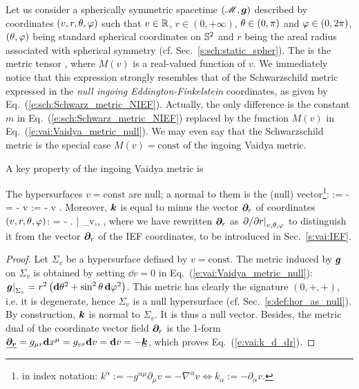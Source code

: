Let us consider a spherically symmetric spacetime $(\mathscr{M},\bm{g})$ described by
coordinates $(v,r,\theta,\varphi)$ such that $v\in \mathbb{R}$, $r\in(0, +\infty)$,
$\theta\in(0,\pi)$ and $\varphi\in(0,2\pi)$, $(\theta,\varphi)$ being standard
spherical coordinates on $\mathbb{S}^2$ and $r$ being the areal radius associated
with spherical symmetry (cf. Sec.~\ref{s:sch:static_spher}).
The 
is the metric tensor
\be \label{e:vai:Vaidya_metric_null}
     ,
\ee
where $M(v)$ is a real-valued function of $v$.
We immediately notice that this expression strongly resembles that
of the Schwarzschild metric expressed in the
\emph{null ingoing Eddington-Finkelstein}
coordinates, as given by Eq.~(\ref{e:sch:Schwarz_metric_NIEF}). Actually, the
only difference is the constant $m$ in Eq.~(\ref{e:sch:Schwarz_metric_NIEF})
replaced by the function $M(v)$ in Eq.~(\ref{e:vai:Vaidya_metric_null}).
We may even say that the Schwarzschild metric is the special case $M(v) = \mathrm{const}$ of
the ingoing Vaidya metric.

A key property of the ingoing Vaidya metric is
\begin{prop}[null hypersurfaces $\bm{v = \mathrm{const}}$ and their normals]
The hypersurfaces $v = \mathrm{const}$ are null; a normal to them is the (null)
vector\footnote{in index notation: $k^\alpha := - g^{\alpha\mu} \partial_\mu v = - \nabla^\alpha v \iff
k_\alpha := - \partial_\alpha v $.}:
\be \label{e:vai:def_k}
     := -  = - \vw{\nabla} v \quad\iff\quad
     := - \dd v .
\ee
Moreover, $\bm{k}$ is equal to minus the vector $\bm{\partial}_r$ of coordinates
$(v,r,\theta,\varphi)$:
\be \label{e:vai:k_d_dr}
     = - \left.  \right| _{v,\th,\ph} ,
\ee
where we have rewritten $\bm{\partial}_r$ as $\left. {\partial }/{\partial r} \right| _{v,\theta,\varphi}$
to distinguish it from the vector $\bm{\partial}_r$ of the IEF coordinates, to be
introduced in Sec.~\ref{s:vai:IEF}.
\end{prop}
\begin{proof}
Let $\Sigma_v$ be a hypersurface defined by $v = \mathrm{const}$.
The metric induced by $\bm{g}$ on $\Sigma_v$
is obtained by setting $\dd v = 0$ in Eq.~(\ref{e:vai:Vaidya_metric_null}):
$\left.\bm{g}\right| _{\Sigma_v} = r^2 \left( \mathbf{d}\theta^2 + \sin^2\theta\, \mathbf{d}\varphi^2 \right)$.
This metric has clearly the signature $(0, +, +)$, i.e. it is degenerate, hence
$\Sigma_v$ is a null hypersurface (cf. Sec.~\ref{s:def:hor_as_null}).
By construction, $\bm{k}$ is normal to $\Sigma_v$. It is thus a null vector.
Besides, the metric dual of
the coordinate vector field $\bm{\partial}_r$ is the 1-form
$\underline{\bm{\bm{\partial}_r}} = g_{\mu r}\mathbf{d} x^\mu = g_{vr} \mathbf{d} v = \mathbf{d} v = - \underline{\bm{k}}$,
which proves Eq.~(\ref{e:vai:k_d_dr}).
\end{proof}

